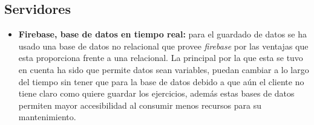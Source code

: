 \subsection{Servidores}
\begin{itemize}
    \item\textbf{Firebase, base de datos en tiempo real:} para el guardado de datos se ha usado
    una base de datos no relacional que provee \textit{firebase} por las ventajas que esta proporciona
    frente a una relacional. La principal por la que esta se tuvo en cuenta ha sido que permite
    datos sean variables, puedan cambiar a lo largo del tiempo sin tener que para la base de datos
    debido a que aún el cliente no tiene claro como quiere guardar los ejercicios, además estas
    bases de datos permiten mayor accesibilidad al consumir menos recursos para su mantenimiento.
\end{itemize}
